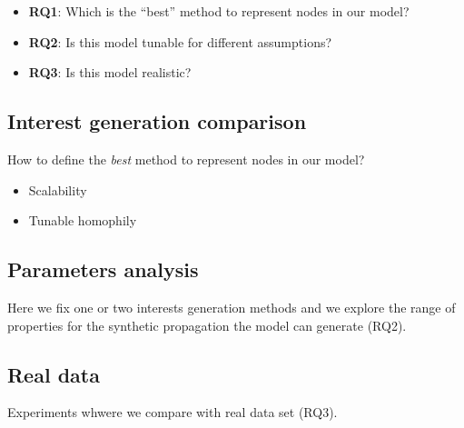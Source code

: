 \begin{itemize}
  \item \textbf{RQ1}: Which is the ``best'' method to represent nodes in our model?
  \item \textbf{RQ2}: Is this model tunable for different assumptions?
  \item \textbf{RQ3}: Is this model realistic?
\end{itemize}

\subsection{Interest generation comparison}

How to define the \emph{best} method to represent nodes in our model?

\begin{itemize}
  \item Scalability
  \item Tunable homophily
\end{itemize}


\subsection{Parameters analysis}

Here we fix one or two interests generation methods and we explore the range of properties for the synthetic propagation the model can generate (RQ2).





\subsection{Real data}

Experiments whwere we compare with real data set (RQ3).
